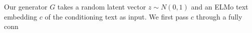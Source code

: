 Our generator $G$ takes a random latent vector $z \sim N(0, 1)$ and an ELMo text embedding $c$ of the conditioning text as input. We first pass $c$ through a fully conn 